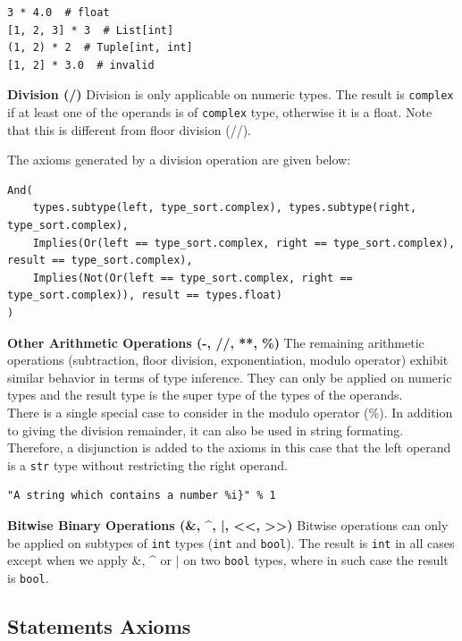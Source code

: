 \begin{lstlisting}
3 * 4.0  # float
[1, 2, 3] * 3  # List[int]
(1, 2) * 2  # Tuple[int, int]
[1, 2] * 3.0  # invalid
\end{lstlisting}

\textbf{Division (/)} Division is only applicable on numeric types. The result is \lstinline|complex| if at least one of the operands is of \lstinline|complex| type, otherwise it is a float. Note that this is different from floor division (//).

The axioms generated by a division operation are given below:

\begin{lstlisting}
And(
	types.subtype(left, type_sort.complex), types.subtype(right, type_sort.complex),
	Implies(Or(left == type_sort.complex, right == type_sort.complex), result == type_sort.complex),
	Implies(Not(Or(left == type_sort.complex, right == type_sort.complex)), result == types.float)
)
\end{lstlisting}

\textbf{Other Arithmetic Operations (-, //, **, \%)}
The remaining arithmetic operations (subtraction, floor division, exponentiation, modulo operator) exhibit similar behavior in terms of type inference. They can only be applied on numeric types and the result type is the super type of the types of the operands. \\

There is a single special case to consider in the modulo operator (\%). In addition to giving the division remainder, it can also be used in string formating. Therefore, a disjunction is added to the axioms in this case that the left operand is a \lstinline|str| type without restricting the right operand.

\begin{lstlisting}
"A string which contains a number %i}" % 1
\end{lstlisting}

\textbf{Bitwise Binary Operations (\&, \textrm{\^}, |, <<, >>)}
Bitwise operations can only be applied on subtypes of \lstinline|int| types (\lstinline|int| and \lstinline|bool|). The result is \lstinline|int| in all cases except when we apply \&, \textrm{\^} or | on two \lstinline|bool| types, where in such case the result is \lstinline|bool|.

\subsection{Statements Axioms}
